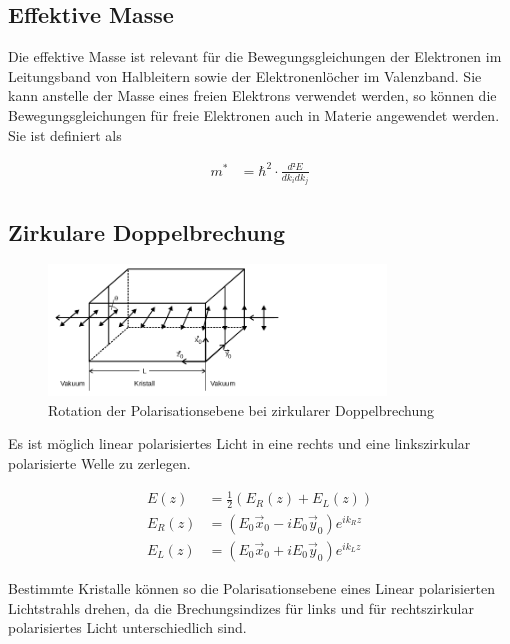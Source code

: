\subsection{Effektive Masse \cite[][Kap. 14]{book:expi3}}

Die effektive Masse ist relevant für die Bewegungsgleichungen der Elektronen im
Leitungsband von Halbleitern sowie der Elektronenlöcher im Valenzband. Sie
kann anstelle der Masse eines freien Elektrons verwendet werden, so können die
Bewegungsgleichungen für freie Elektronen auch in Materie angewendet werden. Sie ist
definiert als

\begin{align}
	m^* & = \hbar^2 \cdot \frac{d²E}{d k_i d k_j}
\end{align}

\subsection{Zirkulare Doppelbrechung \cite{man_a}}
\begin{figure}[H]
	\centering
	\includegraphics[width=0.8\textwidth]{./Bilder/zirpol.png}
	\caption{Rotation der Polarisationsebene bei zirkularer Doppelbrechung \cite{man_a} }\label{fig:zirpol}
\end{figure}

Es ist möglich linear polarisiertes Licht in eine
rechts und eine linkszirkular polarisierte Welle zu zerlegen.

\begin{align}
	E(z)    & = \frac{1}{2}(E_R(z) + E_L(z))                   \\
	E_R (z) & = (E_0 \vec{x}_0  - i E_0 \vec{y}_0) e^{i k_R z} \\
	E_L (z) & = (E_0 \vec{x}_0  + i E_0 \vec{y}_0) e^{i k_L z}
\end{align}


Bestimmte Kristalle können so die Polarisationsebene eines Linear polarisierten
Lichtstrahls drehen, da die Brechungsindizes für links und für rechtszirkular 
polarisiertes Licht unterschiedlich sind. 

